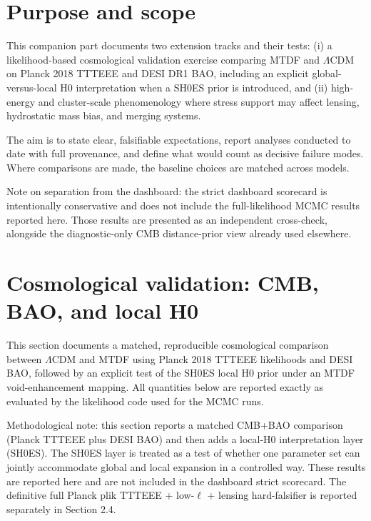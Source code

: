 \documentclass[11pt,a4paper]{article}
\begin{document}
\section{Purpose and scope}
\label{sec:purpose}
This companion part documents two extension tracks and their tests: (i) a likelihood-based cosmological validation exercise comparing MTDF and $\Lambda$CDM on Planck 2018 TTTEEE and DESI DR1 BAO, including an explicit global-versus-local H0 interpretation when a SH0ES prior is introduced, and (ii) high-energy and cluster-scale phenomenology where stress support may affect lensing, hydrostatic mass bias, and merging systems.

The aim is to state clear, falsifiable expectations, report analyses conducted to date with full provenance, and define what would count as decisive failure modes. Where comparisons are made, the baseline choices are matched across models.

\begin{mdframed}[linecolor=accent,linewidth=0.5pt,backgroundcolor=callout-bg,leftline=true,rightline=true,topline=true,bottomline=true,innerleftmargin=8pt,innerrightmargin=8pt,innertopmargin=6pt,innerbottommargin=6pt]
Note on separation from the dashboard: the strict dashboard scorecard is intentionally conservative and does not include the full-likelihood MCMC results reported here. Those results are presented as an independent cross-check, alongside the diagnostic-only CMB distance-prior view already used elsewhere.
\end{mdframed}


\section{Cosmological validation: CMB, BAO, and local H0}
\label{sec:cosmo}
This section documents a matched, reproducible cosmological comparison between $\Lambda$CDM and MTDF using Planck 2018 TTTEEE likelihoods and DESI BAO, followed by an explicit test of the SH0ES local H0 prior under an MTDF void-enhancement mapping. All quantities below are reported exactly as evaluated by the likelihood code used for the MCMC runs.

\begin{mdframed}[linecolor=accent,linewidth=0.5pt,backgroundcolor=callout-bg,leftline=true,rightline=true,topline=true,bottomline=true,innerleftmargin=8pt,innerrightmargin=8pt,innertopmargin=6pt,innerbottommargin=6pt]
Methodological note: this section reports a matched CMB+BAO comparison (Planck TTTEEE plus DESI BAO) and then adds a local-H0 interpretation layer (SH0ES). The SH0ES layer is treated as a test of whether one parameter set can jointly accommodate global and local expansion in a controlled way. These results are reported here and are not included in the dashboard strict scorecard. The definitive full Planck plik TTTEEE + low-$\ell$ + lensing hard-falsifier is reported separately in Section 2.4.
\end{mdframed}
\end{document}
